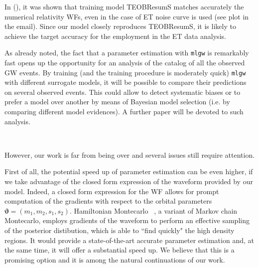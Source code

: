 In \cite{} (), it was shown that training model TEOBResumS matches accurately the numerical relativity WFs, even in the case of ET noise curve is used (see plot in the email). Since our model closely reproduces TEOBResumS, it is likely to achieve the target accuracy for the employment in the ET data analysis.
\par
As already noted, the fact that a parameter estimation with \texttt{mlgw} is remarkably fast opens up the opportunity for an analysis of the catalog of all the observed GW events.
By training (and the training procedure is moderately quick) \texttt{mlgw} with different surrogate models, it will be possible to compare their predictions on several observed events. This could allow to detect systematic biases or to prefer a model over another by means of Bayesian model selection (i.e. by comparing different model evidences).
A further paper will be devoted to such analysis.
\par
{}\\
\par
However, our work is far from being over and several issues still require attention.
\par
First of all, the potential speed up of parameter estimation can be even higher, if we take advantage of the closed form expression of the waveform provided by our model.
Indeed, a closed form expression for the WF allows for prompt computation of the gradients with respect to the orbital parameters $ \boldsymbol{\vartheta} = (m_1,m_2, {s}_1,{s}_2) $.
Hamiltonian Montecarlo \cite{betancourt2017hamiltonianMC}~\cite{Porter2014Hamiltonian_MonteCarlo}, a variant of Markov chain Montecarlo, employs gradients of the waveform to perform an effective sampling of the posterior distibution, which is able to ``find quickly" the high density regions.
It would provide a state-of-the-art accurate parameter estimation and, at the same time, it will offer a substantial speed up.
We believe that this is a promising option and it is among the natural continuations of our work.
